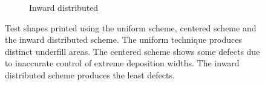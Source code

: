 {\begin{figure}
\begin{subfigure}{\figwidth}
\caption{Inward distributed}\label{print_inward}
\end{subfigure}
\caption{
Test shapes printed using the uniform scheme, centered scheme and the inward distributed scheme.
The uniform technique produces distinct underfill areas.
The centered scheme shows some defects due to inaccurate control of extreme deposition widths.
The inward distributed scheme produces the least defects.
}
\label{prints}
\end{figure}


}
